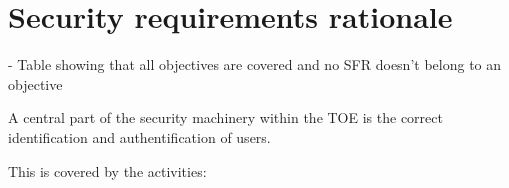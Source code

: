 \documentclass[10pt,a4paper,english]{scrbook}
\begin{document}
\hypertarget{security-requirements-rationale}{}
\section{Security requirements rationale}

- Table showing that all objectives are covered and no SFR doesn't belong to an objective



    A central part of the security machinery within the TOE is the correct
    identification and authentification of users.

    This is covered by the activities:
\end{document}
